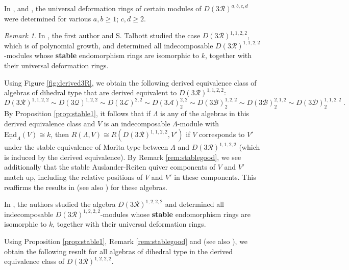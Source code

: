 \documentclass{amsart}
\theoremstyle{plain}
\theoremstyle{definition}
\theoremstyle{remark}
\newtheorem{rem}[thm]{Remark}
\begin{document}
In \cite{blehertalbott}, \cite{blehervelez} and \cite{velez2015}, the universal deformation rings of certain modules of
$D(3\mathcal{R})^{a,b,c,d}$ were determined for various $a,b\ge 1$; $c,d\ge 2$.

\begin{rem}
\label{rem:derivedex1}
In \cite{blehertalbott}, the first author and S. Talbott studied the case $D(3\mathcal{R})^{1,1,2,2}$, which is of polynomial growth, 
and determined all indecomposable $D(3\mathcal{R})^{1,1,2,2}$-modules whose {\bf stable} endomorphism rings are isomorphic to $k$,
together with their universal deformation rings.

Using Figure \ref{fig:derived3R}, we obtain the following derived equivalence class of algebras of dihedral type that are derived equivalent to
$D(3\mathcal{R})^{1,1,2,2}$:
$$D(3\mathcal{R})^{1,1,2,2} \sim D(3\mathcal{Q})^{1,2,2} \sim D(3\mathcal{L})^{2,2} \sim
D(3\mathcal{A})_2^{2,2}\sim D(3\mathcal{B})_2^{1,2,2}\sim D(3\mathcal{B})_2^{2,1,2}\sim D(3\mathcal{D})_2^{1,1,2,2}\;.$$
By Proposition \ref{prop:stable1}, it follows 
that if $\Lambda$ is any of the algebras in this derived equivalence class and $V$ is an indecomposable $\Lambda$-module
with $\underline{\mathrm{End}}_\Lambda(V)\cong k$, then $R(\Lambda,V)\cong R(D(3\mathcal{R})^{1,1,2,2},V')$ if $V$
corresponds to $V'$ under the stable  equivalence of Morita type between $\Lambda$ and $D(3\mathcal{R})^{1,1,2,2}$ (which is
induced by the derived equivalence). By 
Remark \ref{rem:stablegood}, we see additionally that the stable Auslander-Reiten quiver components of $V$ and $V'$
match up, including the relative positions of $V$ and $V'$ in these components. This reaffirms the results in \cite[Thm. 1.1]{blehertalbott}
(see also  \cite[Props. 3.1--3.3]{blehertalbott}) for these algebras.
\end{rem}

In \cite[Sect. 3]{blehervelez}, the authors studied the algebra $D(3\mathcal{R})^{1,2,2,2}$  and determined all
indecomposable $D(3\mathcal{R})^{1,2,2,2}$-modules whose {\bf stable} endomorphism rings are isomorphic to $k$,
together with their universal deformation rings. 

Using Proposition \ref{prop:stable1}, Remark \ref{rem:stablegood} and 
\cite[Thm. 1.2]{blehervelez} (see also \cite[Thm. 3.8, Props. 3.9--3.11]{blehervelez}), 
we obtain the following result for all algebras of dihedral type  in the derived equivalence class of $D(3\mathcal{R})^{1,2,2,2}$.
\end{document}
